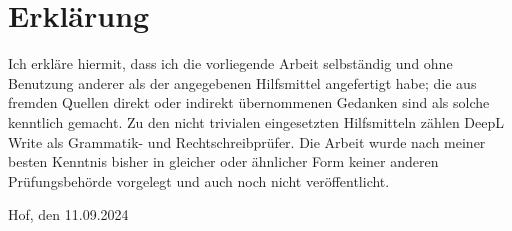 \clearpage
{}
\pagestyle{empty}

\section*{Erklärung}

\vspace*{2cm}

\noindent Ich erkläre hiermit, dass ich die vorliegende Arbeit selbständig und ohne Benutzung
anderer als der angegebenen Hilfsmittel angefertigt habe; die aus fremden Quellen
direkt oder indirekt übernommenen Gedanken sind als solche kenntlich gemacht.
Zu den nicht trivialen eingesetzten Hilfsmitteln zählen DeepL Write als Grammatik- und Rechtschreibprüfer.
Die Arbeit wurde nach meiner besten Kenntnis bisher in gleicher oder ähnlicher Form
keiner anderen Prüfungsbehörde vorgelegt und auch noch nicht veröffentlicht.

\vspace*{5cm}

\noindent Hof, den 11.09.2024

\vspace*{3cm}

\noindent \myname

\restoregeometry